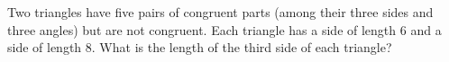 Two triangles have five pairs of congruent parts (among their three sides and three angles) but are not congruent. Each triangle has a side of length $6$ and a side of length $8$. What is the length of the third side of each triangle?
